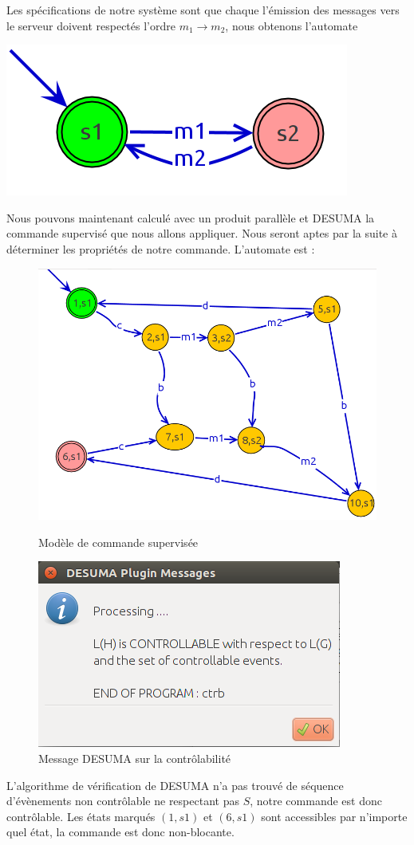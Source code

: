 Les spécifications de notre système sont que chaque l'émission des messages vers le serveur doivent respectés l'ordre $m_1 \rightarrow m_2$, nous obtenons l'automate 
\begin{center}
\includegraphics[width = .5\textwidth]{./III/images/S.png}
\end{center}
Nous pouvons maintenant calculé avec un produit parallèle et DESUMA la commande supervisé que nous allons appliquer. Nous seront aptes par la suite à déterminer les propriétés de notre commande. L'automate est :\begin{figure}[!ht]
\begin{minipage}{.5\textwidth}
\centering
\includegraphics[width=\textwidth]{./III/images/P_S.png}
\caption{Modèle de commande supervisée}
\end{minipage} \hfill
\begin{minipage}{.5\textwidth}
\centering
\includegraphics[width=\textwidth]{./III/images/P_S_ctrbl.png}
\caption{Message DESUMA sur la contrôlabilité}
\end{minipage}
\end{figure}

L'algorithme de vérification de DESUMA n'a pas trouvé de séquence d'évènements non contrôlable ne respectant pas $S$, notre commande est donc contrôlable. Les états marqués $(1,s1)$ et $(6,s1)$ sont accessibles par n'importe quel état, la commande est donc non-blocante.